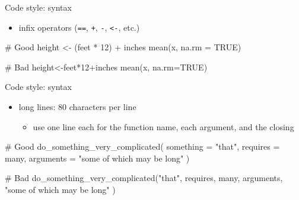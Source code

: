 \documentclass[
  ignorenonframetext,
]{beamer}
\newenvironment{Shaded}{\begin{snugshade}}{\end{snugshade}}
\newcommand{\AttributeTok}[1]{\textcolor[rgb]{0.40,0.45,0.13}{#1}}
\newcommand{\CommentTok}[1]{\textcolor[rgb]{0.37,0.37,0.37}{#1}}
\newcommand{\ConstantTok}[1]{\textcolor[rgb]{0.56,0.35,0.01}{#1}}
\newcommand{\DecValTok}[1]{\textcolor[rgb]{0.68,0.00,0.00}{#1}}
\newcommand{\FunctionTok}[1]{\textcolor[rgb]{0.28,0.35,0.67}{#1}}
\newcommand{\NormalTok}[1]{\textcolor[rgb]{0.00,0.23,0.31}{#1}}
\newcommand{\OtherTok}[1]{\textcolor[rgb]{0.00,0.23,0.31}{#1}}
\newcommand{\SpecialCharTok}[1]{\textcolor[rgb]{0.37,0.37,0.37}{#1}}
\newcommand{\StringTok}[1]{\textcolor[rgb]{0.13,0.47,0.30}{#1}}
\providecommand{\tightlist}{%
  \setlength{\itemsep}{0pt}\setlength{\parskip}{0pt}}\usepackage{longtable,booktabs,array}
\begin{document}
\begin{frame}[fragile]{Code style: syntax}
\protect\hypertarget{code-style-syntax-2}{}
\begin{itemize}
\tightlist
\item
  infix operators (\texttt{==}, \texttt{+}, \texttt{-},
  \texttt{\textless{}-}, etc.)
\end{itemize}

\begin{Shaded}
\begin{Highlighting}[]
\CommentTok{\# Good}
\NormalTok{height }\OtherTok{\textless{}{-}}\NormalTok{ (feet }\SpecialCharTok{*} \DecValTok{12}\NormalTok{) }\SpecialCharTok{+}\NormalTok{ inches}
\FunctionTok{mean}\NormalTok{(x, }\AttributeTok{na.rm =} \ConstantTok{TRUE}\NormalTok{)}

\CommentTok{\# Bad}
\NormalTok{height}\OtherTok{\textless{}{-}}\NormalTok{feet}\SpecialCharTok{*}\DecValTok{12}\SpecialCharTok{+}\NormalTok{inches}
\FunctionTok{mean}\NormalTok{(x, }\AttributeTok{na.rm=}\ConstantTok{TRUE}\NormalTok{)}
\end{Highlighting}
\end{Shaded}
\end{frame}

\begin{frame}[fragile]{Code style: syntax}
\protect\hypertarget{code-style-syntax-3}{}
\begin{itemize}
\tightlist
\item
  long lines: 80 characters per line

  \begin{itemize}
  \tightlist
  \item
    use one line each for the function name, each argument, and the
    closing
  \end{itemize}
\end{itemize}

\begin{Shaded}
\begin{Highlighting}[]
\CommentTok{\# Good}
\FunctionTok{do\_something\_very\_complicated}\NormalTok{(}
  \AttributeTok{something =} \StringTok{"that"}\NormalTok{,}
  \AttributeTok{requires =}\NormalTok{ many,}
  \AttributeTok{arguments =} \StringTok{"some of which may be long"}
\NormalTok{)}

\CommentTok{\# Bad}
\FunctionTok{do\_something\_very\_complicated}\NormalTok{(}\StringTok{"that"}\NormalTok{, requires, many, arguments,}
                              \StringTok{"some of which may be long"}
\NormalTok{                              )}
\end{Highlighting}
\end{Shaded}
\end{frame}
\end{document}
